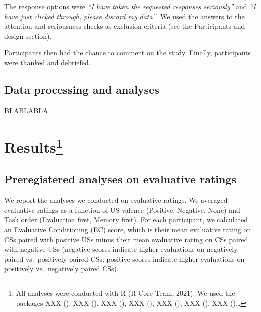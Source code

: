 \documentclass[
  man,floatsintext]{apa6}
\begin{document}
The response options were \emph{``I have taken the requested responses seriously''} and \emph{``I have just clicked through, please discard my data''}. We used the answers to the attention and seriousness checks as exclusion criteria (see the Participants and design section).

Participants then had the chance to comment on the study. Finally, participants were thanked and debriefed.

\hypertarget{data-processing-and-analyses}{%
\subsection{Data processing and analyses}\label{data-processing-and-analyses}}

BLABLABLA

\hypertarget{results}{%
\section[Results]{\texorpdfstring{Results\footnote{All analyses were conducted with R (R Core Team, 2021). We used the packages XXX (), XXX (), XXX (), XXX (), XXX (), XXX (), XXX ()\ldots{}}}{Results}}\label{results}}

\hypertarget{preregistered-analyses-on-evaluative-ratings}{%
\subsection{Preregistered analyses on evaluative ratings}\label{preregistered-analyses-on-evaluative-ratings}}

We report the analyses we conducted on evaluative ratings. We averaged evaluative ratings as a function of US valence (Positive, Negative, None) and Task order (Evaluation first, Memory first). For each participant, we calculated an Evaluative Conditioning (EC) score, which is their mean evaluative rating on CSs paired with positive USs minus their mean evaluative rating on CSs paired with negative USs (negative scores indicate higher evaluations on negatively paired vs.~positively paired CSs; positive scores indicate higher evaluations on positively vs.~negatively paired CSs).
\end{document}
